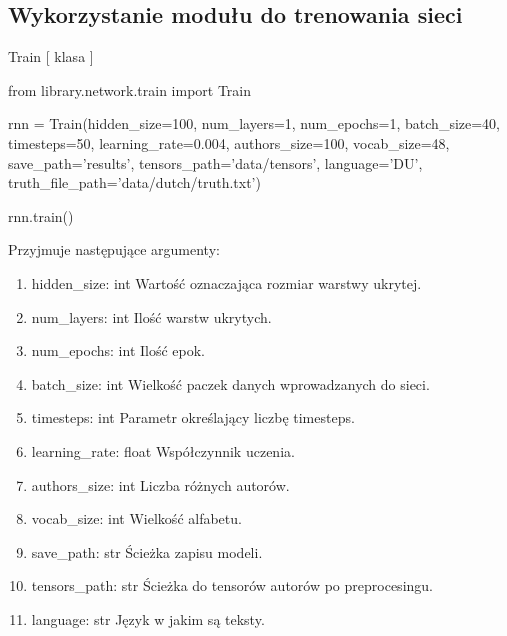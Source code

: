 \newpage
\subsection{Wykorzystanie modułu do trenowania sieci}

\myspace
{}
\myspace

\item {Train [ klasa ] }
\begin{import}
from library.network.train import Train

rnn = Train(hidden_size=100,
            num_layers=1,
            num_epochs=1,
            batch_size=40,
            timesteps=50,
            learning_rate=0.004,
            authors_size=100,
            vocab_size=48,
            save_path='results',
            tensors_path='data/tensors',
            language='DU',
            truth_file_path='data/dutch/truth.txt')
            
rnn.train()
\end{import}

Przyjmuje następujące argumenty:
\begin{enumerate}
	\item hidden\_size: int
		\newline Wartość oznaczająca rozmiar warstwy ukrytej.
	\item num\_layers: int
		\newline Ilość warstw ukrytych.
	\item num\_epochs: int
		\newline Ilość epok.
	\item batch\_size: int
		\newline Wielkość paczek danych wprowadzanych do sieci.
	\item timesteps: int
		\newline Parametr określający liczbę timesteps.
	\item learning\_rate: float
		\newline Współczynnik uczenia.
	\item authors\_size: int
		\newline Liczba różnych autorów.
	\item vocab\_size: int
		\newline Wielkość alfabetu.
	\item save\_path: str
		\newline Ścieżka zapisu modeli.
	\item tensors\_path: str
		\newline Ścieżka do tensorów autorów po preprocesingu.
	\item language: str
		\newline Język w jakim są teksty.
		
\end{enumerate}

